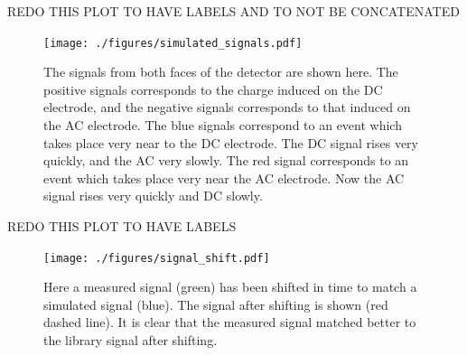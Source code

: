 REDO THIS PLOT TO HAVE LABELS AND TO NOT BE CONCATENATED
\begin{figure}
\begin{centering}
\texttt{[image: ./figures/simulated\_signals.pdf]}
\caption{The signals from both faces of the detector are shown here. The positive signals corresponds to the charge induced on the DC electrode, and the negative signals corresponds to that induced on the AC electrode. The blue signals correspond to an event which takes place very near to the DC electrode. The DC signal rises very quickly, and the AC very slowly. The red signal corresponds to an event which takes place very near the AC electrode. Now the AC signal rises very quickly and DC slowly.}
\label{signals}
\end{centering}
\end{figure}

REDO THIS PLOT TO HAVE LABELS 
\begin{figure}
\begin{centering}
\texttt{[image: ./figures/signal\_shift.pdf]}
\caption{Here a measured signal (green) has been shifted in time to match a simulated signal (blue). The signal after shifting is shown (red dashed line). It is clear that the measured signal matched better to the library signal after shifting.}
\label{shift}
\end{centering}
\end{figure}
